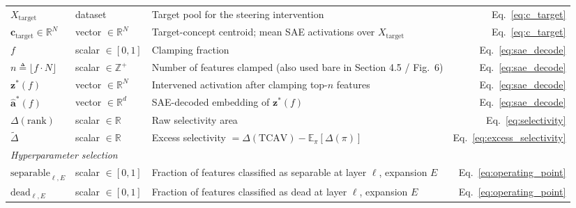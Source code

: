 \documentclass{article}
\begin{document}
\begin{table}[h]
\begin{tabular}{lllr}
$X_{\text{target}}$ & dataset & Target pool for the steering intervention & Eq.~\ref{eq:c_target} \\
$\mathbf{c}_{\text{target}} \in \mathbb{R}^N$ & vector $\in \mathbb{R}^N$ & Target-concept centroid; mean SAE activations over $X_{\text{target}}$ & Eq.~\ref{eq:c_target} \\
$f$ & scalar $\in [0,1]$ & Clamping fraction & Eq.~\ref{eq:sae_decode} \\
$n \triangleq \lfloor f \cdot N \rfloor$ & scalar $\in \mathbb{Z}^+$ & Number of features clamped (also used bare in Section 4.5 / Fig.~6) & Eq.~\ref{eq:sae_decode} \\
$\mathbf{z}^*(f)$ & vector $\in \mathbb{R}^N$ & Intervened activation after clamping top-$n$ features & Eq.~\ref{eq:sae_decode} \\
$\hat{\mathbf{a}}^*(f)$ & vector $\in \mathbb{R}^d$ & SAE-decoded embedding of $\mathbf{z}^*(f)$ & Eq.~\ref{eq:sae_decode} \\
$\Delta(\text{rank})$ & scalar $\in \mathbb{R}$ & Raw selectivity area & Eq.~\ref{eq:selectivity} \\
$\tilde{\Delta}$ & scalar $\in \mathbb{R}$ & Excess selectivity $= \Delta(\text{TCAV}) - \mathbb{E}_\pi[\Delta(\pi)]$ & Eq.~\ref{eq:excess_selectivity} \\
\midrule
\multicolumn{4}{l}{\textit{Hyperparameter selection}} \\
$\text{separable}_{\ell,E}$ & scalar $\in [0,1]$ & Fraction of features classified as separable at layer $\ell$, expansion $E$ & Eq.~\ref{eq:operating_point} \\
$\text{dead}_{\ell,E}$ & scalar $\in [0,1]$ & Fraction of features classified as dead at layer $\ell$, expansion $E$ & Eq.~\ref{eq:operating_point} \\
\bottomrule
\end{tabular}
\end{table}
\end{document}
